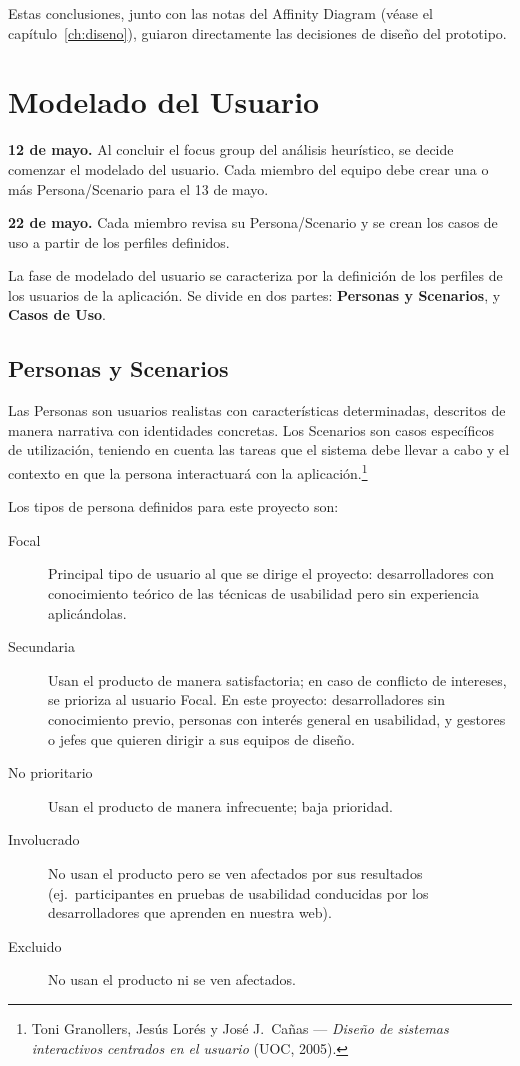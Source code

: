 \documentclass[12pt, a4paper]{report}
\begin{document}
Estas conclusiones, junto con las notas del Affinity Diagram (véase el capítulo~\ref{ch:diseno}),
guiaron directamente las decisiones de diseño del prototipo.

\chapter{Modelado del Usuario}

\begin{notaejecucion}
\textbf{12 de mayo.} Al concluir el focus group del análisis heurístico, se decide comenzar
el modelado del usuario. Cada miembro del equipo debe crear una o más Persona/Scenario
para el 13 de mayo.

\textbf{22 de mayo.} Cada miembro revisa su Persona/Scenario y se crean los casos de uso
a partir de los perfiles definidos.
\end{notaejecucion}

La fase de modelado del usuario se caracteriza por la definición de los perfiles de los
usuarios de la aplicación. Se divide en dos partes: \textbf{Personas y Scenarios}, y
\textbf{Casos de Uso}.

\section{Personas y Scenarios}

Las Personas son usuarios realistas con características determinadas, descritos de manera
narrativa con identidades concretas. Los Scenarios son casos específicos de utilización,
teniendo en cuenta las tareas que el sistema debe llevar a cabo y el contexto en que la
persona interactuará con la aplicación.\footnote{Toni Granollers, Jesús Lorés y José J.\ Cañas
— \textit{Diseño de sistemas interactivos centrados en el usuario} (UOC, 2005).}

Los tipos de persona definidos para este proyecto son:

\begin{description}
  \item[Focal] Principal tipo de usuario al que se dirige el proyecto: desarrolladores con
    conocimiento teórico de las técnicas de usabilidad pero sin experiencia aplicándolas.
  \item[Secundaria] Usan el producto de manera satisfactoria; en caso de conflicto de
    intereses, se prioriza al usuario Focal. En este proyecto: desarrolladores sin
    conocimiento previo, personas con interés general en usabilidad, y gestores o jefes
    que quieren dirigir a sus equipos de diseño.
  \item[No prioritario] Usan el producto de manera infrecuente; baja prioridad.
  \item[Involucrado] No usan el producto pero se ven afectados por sus resultados (ej.\
    participantes en pruebas de usabilidad conducidas por los desarrolladores que aprenden
    en nuestra web).
  \item[Excluido] No usan el producto ni se ven afectados.
\end{description}
\end{document}
